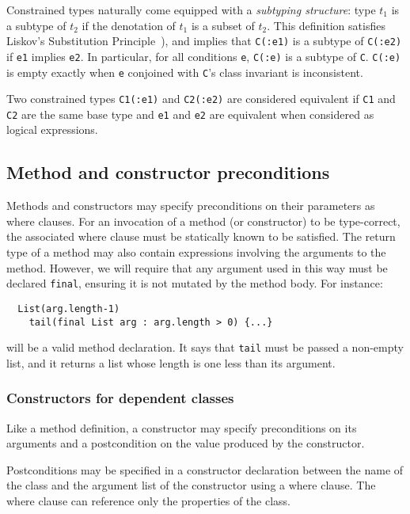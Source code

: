 Constrained types naturally come equipped with a {\em subtyping
structure}: type $t_1$ is a subtype of $t_2$ if the denotation of
$t_1$ is a subset of $t_2$. This definition satisfies
Liskov's Substitution Principle~\cite{liskov-behaviors}),
and implies that
{\tt C(:e1)} is a subtype of {\tt C(:e2)} if {\tt e1} implies {\tt e2}.
In particular, for all conditions {\tt e},
{\tt C(:e)} is a subtype of {\tt C}.
{\tt C(:e)} is empty exactly
when {\tt e} conjoined with {\tt C}'s class invariant is inconsistent.

Two constrained types {\tt C1(:e1)} and {\tt C2(:e2)} are considered equivalent
if {\tt C1} and {\tt C2} are the same base type and {\tt e1} and
{\tt e2} are equivalent when considered as logical expressions.

\subsection{Method and constructor preconditions}

Methods and constructors may specify preconditions
on their parameters as where clauses.
For an invocation of a method (or
constructor) to be type-correct, the
associated where clause must be statically known to be satisfied. The
return type of a method may also contain expressions involving the
arguments to the method. However, we will require
that any argument used in this way must be declared {\tt final},
ensuring it is not mutated by the method body.
For instance:
\begin{verbatim}
  List(arg.length-1)
    tail(final List arg : arg.length > 0) {...}
\end{verbatim}
\noindent will be a valid method declaration. It says that
{\tt tail} must be passed a non-empty list, and it returns a list
whose length is one less than its argument.

\subsubsection{Constructors for dependent classes}

Like a method definition,
a constructor may
specify preconditions on its arguments
and a postcondition on the value produced by the constructor.

Postconditions may be specified in a constructor declaration between
the name of the class and the argument list of the constructor using a
where clause. The where clause can reference only the properties of
the class.

